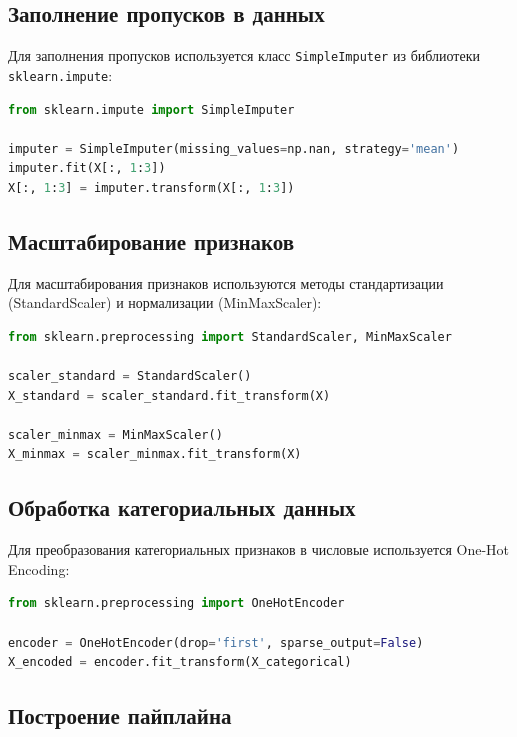 \subsection{Заполнение пропусков в данных}

Для заполнения пропусков используется класс \texttt{SimpleImputer} из библиотеки \texttt{sklearn.impute}:

\begin{lstlisting}[language=Python, caption=Заполнение пропусков]
from sklearn.impute import SimpleImputer

imputer = SimpleImputer(missing_values=np.nan, strategy='mean')
imputer.fit(X[:, 1:3])
X[:, 1:3] = imputer.transform(X[:, 1:3])
\end{lstlisting}

\subsection{Масштабирование признаков}

Для масштабирования признаков используются методы стандартизации (StandardScaler) и нормализации (MinMaxScaler):

\begin{lstlisting}[language=Python, caption=Масштабирование признаков]
from sklearn.preprocessing import StandardScaler, MinMaxScaler

scaler_standard = StandardScaler()
X_standard = scaler_standard.fit_transform(X)

scaler_minmax = MinMaxScaler()
X_minmax = scaler_minmax.fit_transform(X)
\end{lstlisting}

\subsection{Обработка категориальных данных}

Для преобразования категориальных признаков в числовые используется One-Hot Encoding:

\begin{lstlisting}[language=Python, caption=One-Hot Encoding]
from sklearn.preprocessing import OneHotEncoder

encoder = OneHotEncoder(drop='first', sparse_output=False)
X_encoded = encoder.fit_transform(X_categorical)
\end{lstlisting}

\subsection{Построение пайплайна}

